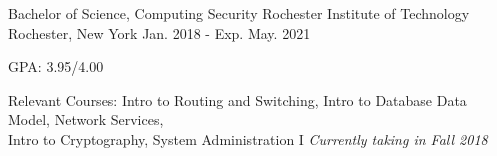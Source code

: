 

\begin{cventries}

  \cventry
    {Bachelor of Science, Computing Security} %
    {Rochester Institute of Technology} %
    {Rochester, New York} %
    {Jan. 2018 - Exp. May. 2021} %
    {
      \begin{cvitems} %
        \item {GPA: 3.95/4.00}
        \item { Relevant Courses: Intro to Routing and Switching, Intro to Database \text{&} Data Model, Network Services\text{*},\\ Intro to Cryptography\text{*}, System Administration I\text{*} \hspace*{0pt}\hfill \text{*} \textit{Currently taking in Fall 2018} }     
      \end{cvitems}
    }

\end{cventries}
